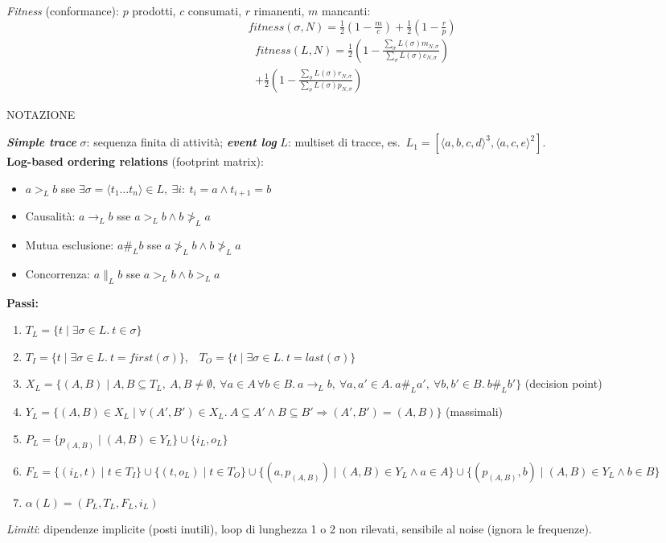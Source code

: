 \documentclass[8pt,a4paper]{extarticle}
\newcommand{\NOT}{\colorbox{black!12}{\tiny\textsf{NOTAZIONE}}}
\newcommand{\topic}[2]{%
  \Needspace*{5\baselineskip}%
  \vspace{3pt}\noindent{\color{tit}\bfseries\footnotesize #1}\hfill #2\par
  \vspace{-1pt}{\color{tit}\rule{\linewidth}{0.6pt}}\par\vspace{1pt}}
\newcommand{\D}[1]{\textbf{\textit{#1}}}
\begin{document}
\begin{multicols}{3}
\emph{Fitness} (conformance): $p$ prodotti, $c$ consumati, $r$ rimanenti, $m$ mancanti:
\[ fitness(\sigma,N)=\tfrac12\left(1-\tfrac{m}{c}\right)+\tfrac12\left(1-\tfrac{r}{p}\right)\]
\begin{gather*}
fitness(L,N)=\tfrac12\!\left(\!1-\tfrac{\sum_\sigma L(\sigma)m_{N,\sigma}}{\sum_\sigma L(\sigma)c_{N,\sigma}}\!\right)\\
+\tfrac12\!\left(\!1-\tfrac{\sum_\sigma L(\sigma)r_{N,\sigma}}{\sum_\sigma L(\sigma)p_{N,\sigma}}\!\right)
\end{gather*}

\topic{12. $\alpha$-algorithm}{\NOT}
\D{Simple trace} $\sigma$: sequenza finita di attività; \D{event log} $L$: multiset di tracce, es.\ $L_1=[\langle a,b,c,d\rangle^3,\langle a,c,e\rangle^2]$.\\
\textbf{Log-based ordering relations} (footprint matrix):
\begin{itemize}
\item $a>_L b$ sse $\exists\sigma=\langle t_1\dots t_n\rangle\in L,\ \exists i:\ t_i=a\wedge t_{i+1}=b$
\item Causalità: $a\rightarrow_L b$ sse $a>_L b \wedge b\not>_L a$
\item Mutua esclusione: $a\#_L b$ sse $a\not>_L b\wedge b\not>_L a$
\item Concorrenza: $a\parallel_L b$ sse $a>_L b\wedge b>_L a$
\end{itemize}
\textbf{Passi:}
\begin{enumerate}
\item $T_L=\{t\mid \exists\sigma\in L.\ t\in\sigma\}$
\item $T_I=\{t\mid\exists\sigma\in L.\ t=first(\sigma)\}$,\ \ $T_O=\{t\mid\exists\sigma\in L.\ t=last(\sigma)\}$
\item $X_L=\{(A,B)\mid A,B\subseteq T_L,\ A,B\neq\emptyset,\ \forall a\in A\,\forall b\in B.\ a\rightarrow_L b,\ \forall a,a'\in A.\ a\#_L a',\ \forall b,b'\in B.\ b\#_L b'\}$ (decision point)
\item $Y_L=\{(A,B)\in X_L\mid \forall (A',B')\in X_L.\ A\subseteq A'\wedge B\subseteq B'\Rightarrow (A',B')=(A,B)\}$ (massimali)
\item $P_L=\{p_{(A,B)}\mid (A,B)\in Y_L\}\cup\{i_L,o_L\}$
\item $F_L=\{(i_L,t)\mid t\in T_I\}\cup\{(t,o_L)\mid t\in T_O\}\cup\{(a,p_{(A,B)})\mid (A,B)\in Y_L\wedge a\in A\}\cup\{(p_{(A,B)},b)\mid (A,B)\in Y_L\wedge b\in B\}$
\item $\alpha(L)=(P_L,T_L,F_L,i_L)$
\end{enumerate}
\emph{Limiti}: dipendenze implicite (posti inutili), loop di lunghezza 1 o 2 non rilevati, sensibile al noise (ignora le frequenze).

\end{multicols}
\end{document}
